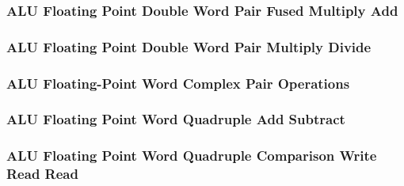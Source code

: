 \subsubsection[{\small ALU Floating Point Double Word Pair Fused Multiply Add}]{ALU Floating Point Double Word Pair Fused Multiply Add} \label{sec:format-ALU-FDPFMA}



\subsubsection[{\small ALU Floating Point Double Word Pair Multiply Divide}]{ALU Floating Point Double Word Pair Multiply Divide} \label{sec:format-ALU-FDPMUL}



\subsubsection[{\small ALU Floating-Point Word Complex Pair Operations}]{ALU Floating-Point Word Complex Pair Operations} \label{sec:format-ALU-FWCPOP}



\subsubsection[{\small ALU Floating Point Word Quadruple Add Subtract}]{ALU Floating Point Word Quadruple Add Subtract} \label{sec:format-ALU-FWQADD}



\subsubsection[{\small ALU Floating Point Word Quadruple Comparison Write Read Read}]{ALU Floating Point Word Quadruple Comparison Write Read Read} \label{sec:format-ALU-FWQCWRR}



